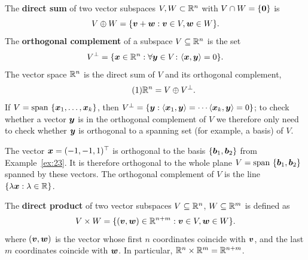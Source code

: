 The \textbf{direct sum} of two vector subspaces $V,W\subset \mathbb{R}^n$ with $V\cap W=\{\bm{0}\}$ is
\begin{equation*}
 V\oplus W = \{\bm{v}+\bm{w} \mathrel{\mathop{:}} \bm{v}\in V, \bm{w}\in W\}.
\end{equation*}
The \strictpagecheck{}\textbf{orthogonal complement} of a subspace $V\subseteq \mathbb{R}^n$ is the set 
\begin{equation*}
 V^{\perp}=\{\bm{x}\in \mathbb{R}^n\mathrel{\mathop{:}} \forall \bm{y}\in V\colon \langle {\bm{x}}, {\bm{y}} \rangle=0\}. 
\end{equation*}
The vector space $\mathbb{R}^n$ is the direct sum of $V$ and its orthogonal complement,
\begin{equation}\label{eq:orthocomp}\tag{1}
\mathbb{R}^n = V\oplus V^{\perp}.
\end{equation}
If $V=\mathrm{span}\ \{\vct{x}_1,\dots,\vct{x}_k\}$, then $V^{\perp}=\{\bm{y}\mathrel{\mathop{:}} \langle {\bm{x}_1}, {\bm{y}} \rangle=\cdots \langle {\bm{x}_k}, {\bm{y}} \rangle=0\}$; to check whether a vector $\bm{y}$ is in the orthogonal complement of $V$ we therefore only need to check whether $\bm{y}$ is orthogonal to a spanning set (for example, a basis) of $V$.

\begin{example}
The vector $\bm{x}=(-1,-1,1)^{\top}$ is orthogonal to the basis $\{\bm{b}_1,\bm{b}_2\}$ from Example~\ref{ex:23}. It is therefore orthogonal to the whole plane $V=\mathrm{span} \ \{\vct{b}_1,\vct{b}_2\}$ spanned by these vectors. The orthogonal complement of $V$ is the line $\{\lambda \bm{x}\mathrel{\mathop{:}} \lambda\in \mathbb{R}\}$.
\end{example}

The \textbf{direct product} of two vector subspaces $V\subseteq \mathbb{R}^n$, $W\subseteq \mathbb{R}^m$ is defined as
\begin{equation*}
 V\times W = \{(\bm{v},\bm{w})\in \mathbb{R}^{n+m} \mathrel{\mathop{:}} \bm{v}\in V, \bm{w}\in W\}.
\end{equation*}
where $(\bm{v},\bm{w})$ is the vector whose first $n$ coordinates coincide with $\bm{v}$, and the last $m$ coordinates coincide with $\bm{w}$. In particular, $\mathbb{R}^{n}\times \mathbb{R}^m = \mathbb{R}^{n+m}$.

